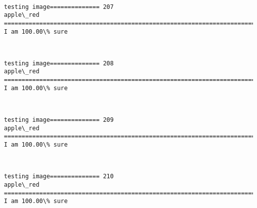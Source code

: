 \documentclass[11pt]{article}
\begin{document}
    \begin{center}
    \end{center}
    { \hspace*{\fill} \\}
    
    \begin{Verbatim}[commandchars=\\\{\}]
testing image============== 207
apple\_red
============================================================================
I am 100.00\% sure

    \end{Verbatim}

    \begin{center}
    \end{center}
    { \hspace*{\fill} \\}
    
    \begin{Verbatim}[commandchars=\\\{\}]
testing image============== 208
apple\_red
============================================================================
I am 100.00\% sure

    \end{Verbatim}

    \begin{center}
    \end{center}
    { \hspace*{\fill} \\}
    
    \begin{Verbatim}[commandchars=\\\{\}]
testing image============== 209
apple\_red
============================================================================
I am 100.00\% sure

    \end{Verbatim}

    \begin{center}
    \end{center}
    { \hspace*{\fill} \\}
    
    \begin{Verbatim}[commandchars=\\\{\}]
testing image============== 210
apple\_red
============================================================================
I am 100.00\% sure

    \end{Verbatim}
\end{document}
